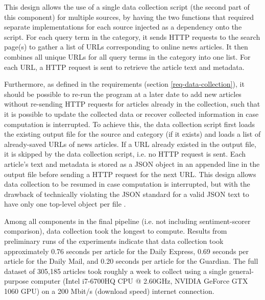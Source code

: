\documentclass{report}
\begin{document}
This design allows the use of a single data collection script (the second part of this component) for multiple sources, by having the two functions that required separate implementations for each source injected as a dependency onto the script.
For each query term in the category, it sends HTTP requests to the search page(s) to gather a list of URLs corresponding to online news articles.
It then combines all unique URLs for all query terms in the category into one list.
For each URL, a HTTP request is sent to retrieve the article text and metadata.

Furthermore, as defined in the requirements (section \ref{req-data-collection}), it should be possible to re-run the program at a later date to add new articles without re-sending HTTP requests for articles already in the collection, such that it is possible to update the collected data or recover collected information in case computation is interrupted.
To achieve this, the data collection script first loads the existing output file for the source and category (if it exists) and loads a list of already-saved URLs of news articles.
If a URL already existed in the output file, it is skipped by the data collection script, i.e. no HTTP request is sent.
Each article's text and metadata is stored as a JSON object in an appended line in the output file before sending a HTTP request for the next URL.
This design allows data collection to be resumed in case computation is interrupted, but with the drawback of technically violating the JSON standard for a valid JSON text to have only one top-level object per file \cite{rfc8259}.

Among all components in the final pipeline (i.e. not including sentiment-scorer comparison), data collection took the longest to compute.
Results from preliminary runs of the experiments indicate that data collection took approximately 0.76 seconds per article for the Daily Express, 0.69 seconds per article for the Daily Mail, and 0.20 seconds per article for the Guardian.
The full dataset of 305,185 articles took roughly a week to collect using a single general-purpose computer (Intel i7-6700HQ CPU @ 2.60GHz, NVIDIA GeForce GTX 1060 GPU) on a 200 Mbit/s (download speed) internet connection.
\end{document}
